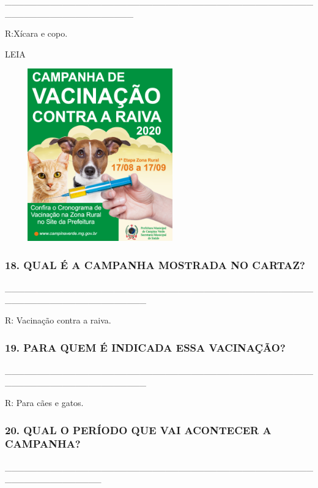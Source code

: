\_\_\_\_\_\_\_\_\_\_\_\_\_\_\_\_\_\_\_\_\_\_\_\_\_\_\_\_\_\_\_\_\_\_\_\_\_\_\_\_\_\_\_\_\_\_\_\_\_\_\_\_\_\_\_\_\_\_\_\_\_\_\_\_\_\_\_\_

R:Xícara e copo.

LEIA

\includegraphics[width=3.23444in,height=2.93410in]{media/image131.png}

\subsubsection{18. QUAL É A CAMPANHA MOSTRADA NO
CARTAZ?}\label{qual-uxe9-a-campanha-mostrada-no-cartaz}

\_\_\_\_\_\_\_\_\_\_\_\_\_\_\_\_\_\_\_\_\_\_\_\_\_\_\_\_\_\_\_\_\_\_\_\_\_\_\_\_\_\_\_\_\_\_\_\_\_\_\_\_\_\_\_\_\_\_\_\_\_\_\_\_\_\_\_\_\_\_

R: Vacinação contra a raiva.

\subsubsection{19. PARA QUEM É INDICADA ESSA
VACINAÇÃO?}\label{para-quem-uxe9-indicada-essa-vacinauxe7uxe3o}

\_\_\_\_\_\_\_\_\_\_\_\_\_\_\_\_\_\_\_\_\_\_\_\_\_\_\_\_\_\_\_\_\_\_\_\_\_\_\_\_\_\_\_\_\_\_\_\_\_\_\_\_\_\_\_\_\_\_\_\_\_\_\_\_\_\_\_\_\_\_

R: Para cães e gatos.\protect\hypertarget{_heading=h.81uy4mz4w5m6}{}{}

\subsubsection{20. QUAL O PERÍODO QUE VAI ACONTECER A
CAMPANHA?}\label{qual-o-peruxedodo-que-vai-acontecer-a-campanha}

\_\_\_\_\_\_\_\_\_\_\_\_\_\_\_\_\_\_\_\_\_\_\_\_\_\_\_\_\_\_\_\_\_\_\_\_\_\_\_\_\_\_\_\_\_\_\_\_\_\_\_\_\_\_\_\_\_\_\_\_\_\_\_

